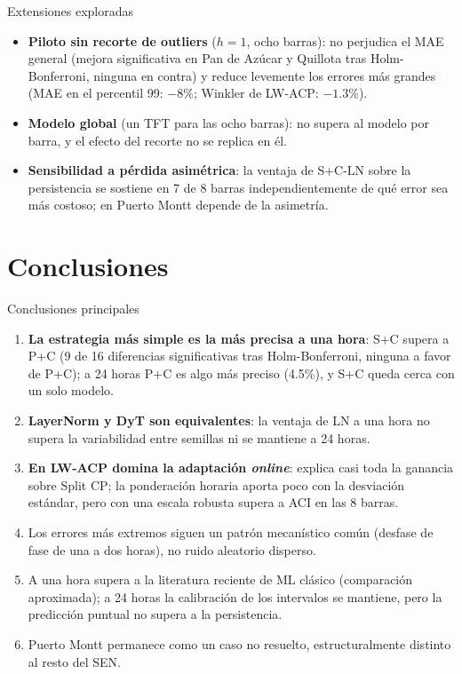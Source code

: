 \documentclass[aspectratio=169]{beamer}
\begin{document}
\begin{frame}{Extensiones exploradas}
    \begin{itemize}
        \item \textbf{Piloto sin recorte de outliers} ($h=1$, ocho barras): no perjudica el MAE general (mejora significativa en Pan de Azúcar y Quillota tras Holm-Bonferroni, ninguna en contra) y reduce levemente los errores más grandes (MAE en el percentil 99: $-8\%$; Winkler de LW-ACP: $-1.3\%$).
        \item \textbf{Modelo global} (un TFT para las ocho barras): no supera al modelo por barra, y el efecto del recorte no se replica en él.
        \item \textbf{Sensibilidad a pérdida asimétrica}: la ventaja de S+C-LN sobre la persistencia se sostiene en 7 de 8 barras independientemente de qué error sea más costoso; en Puerto Montt depende de la asimetría.
    \end{itemize}
\end{frame}

\section{Conclusiones}

\begin{frame}{Conclusiones principales}
    \small
    \begin{enumerate}
        \item \textbf{La estrategia más simple es la más precisa a una hora}: S+C supera a P+C (9 de 16 diferencias significativas tras Holm-Bonferroni, ninguna a favor de P+C); a 24 horas P+C es algo más preciso (4.5\%), y S+C queda cerca con un solo modelo.
        \item \textbf{LayerNorm y DyT son equivalentes}: la ventaja de LN a una hora no supera la variabilidad entre semillas ni se mantiene a 24 horas.
        \item \textbf{En LW-ACP domina la adaptación \textit{online}}: explica casi toda la ganancia sobre Split CP; la ponderación horaria aporta poco con la desviación estándar, pero con una escala robusta supera a ACI en las 8 barras.
        \item Los errores más extremos siguen un patrón mecanístico común (desfase de fase de una a dos horas), no ruido aleatorio disperso.
        \item A una hora supera a la literatura reciente de ML clásico (comparación aproximada); a 24 horas la calibración de los intervalos se mantiene, pero la predicción puntual no supera a la persistencia.
        \item Puerto Montt permanece como un caso no resuelto, estructuralmente distinto al resto del SEN.
    \end{enumerate}
\end{frame}
\end{document}
